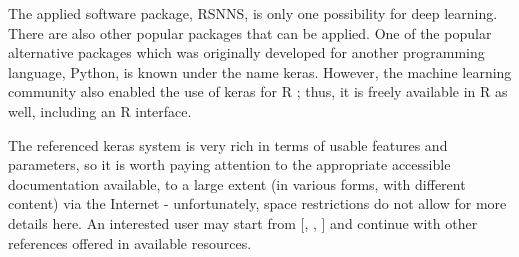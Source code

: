 The applied software package, RSNNS, is only one possibility for deep learning. There are also other popular packages that can be applied. One of the popular alternative packages which was originally developed for another programming language, Python, is known under the name keras. However, the machine learning community also enabled the use of keras for R ; thus, it is freely available in R as well, including an R interface.

The referenced keras system is very rich in terms of usable features and parameters, so it is worth paying attention to the appropriate accessible documentation available, to a large extent (in various forms, with different content) via the Internet - unfortunately, space restrictions do not allow for more details here. An interested user may start from [\cite{ref50}, \cite{ref10}, \cite{ref83}] and continue with other references offered in available resources.

% 